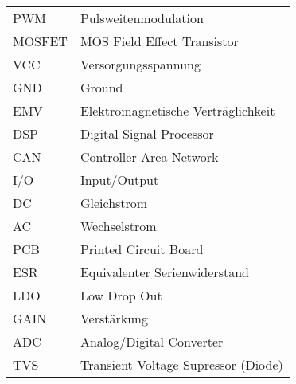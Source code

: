 \documentclass[12pt,paper=a4,fleqn,headsepline,headings=normal,cleardoublepage=current,titlepage,twoside,bibliography=totoc,listof=totoc,numbers=noenddot,parskip=half]{scrbook}  %
\begin{document}
\begin{longtable}{ll}
	PWM & Pulsweitenmodulation\\
	MOSFET & MOS Field Effect Transistor\\
	VCC & Versorgungsspannung\\
	GND & Ground\\
	EMV & Elektromagnetische Verträglichkeit\\
	DSP & Digital Signal Processor\\
	CAN & Controller Area Network\\
	I/O & Input/Output\\
	DC & Gleichstrom\\
	AC & Wechselstrom\\
	PCB & Printed Circuit Board\\
	ESR & Equivalenter Serienwiderstand\\
	LDO & Low Drop Out\\
	GAIN & Verstärkung\\
	ADC & Analog/Digital Converter\\
	TVS & Transient Voltage Supressor (Diode)\\
\end{longtable}

\cleardoublepage











\clearpage						%
\appendix
%

%
%
	
\end{document}
